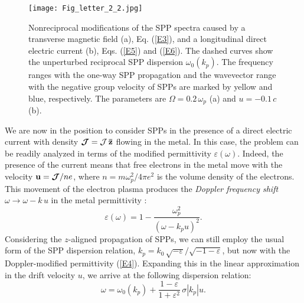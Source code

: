 \documentclass[9pt,twocolumn,twoside]{osajnl}
\begin{document}
\begin{figure}[t]
\centering
\texttt{[image: Fig\_letter\_2\_2.jpg]}
\caption{Nonreciprocal modifications of the SPP spectra caused by a transverse magnetic field (a), Eq. (\ref{E3}), and a longitudinal direct electric current (b), Eqs. (\ref{E5}) and (\ref{E6}). The dashed curves show the unperturbed reciprocal SPP dispersion ${\omega _0}\left( {{k_p}} \right)$. The frequency ranges with the one-way SPP propagation and the wavevector range with the negative group velocity of SPPs are marked by yellow and blue, respectively. The parameters are $\Omega = 0.2\, \omega_p$ (a) and $u=-0.1\,c$ (b).}
\label{F2}
\end{figure}

We are now in the position to consider SPPs in the presence of a direct electric current with density ${{\bm{\mathcal J}}} = {\mathcal J}\,{\bf{\bar z}}$ flowing in the metal. In this case, the problem can be readily analyzed in terms of the modified permittivity $\varepsilon \left( \omega  \right)$. Indeed, the presence of the current means that free electrons in the metal move with the velocity ${\bf{u}} = {{\bm{\mathcal J}}}/n e$, where $n=m\omega_p^2 / 4\pi e^2$ is the volume density of the electrons. This movement of the electron plasma produces the {\it Doppler frequency shift} $\omega  \to \omega  - k\, u$ in the metal permittivity \cite{PK}:
%
\begin{equation}
\varepsilon \left( \omega  \right) = 1 - \frac{{\omega _p^2}}{{{{\left( {\omega  - {k_p}u} \right)}^2}}} .
\label{E4}
\end{equation}
%
Considering the $z$-aligned propagation of SPPs, we can still employ the usual form of the SPP dispersion relation, ${k_p} = {k_0}\,\sqrt { - \varepsilon } /\sqrt { - 1 - \varepsilon }$, but now with the Doppler-modified permittivity (\ref{E4}). Expanding this in the linear approximation in the drift velocity $u$, we arrive at the following dispersion relation:
%
\begin{equation}
\omega  = {\omega _0}\!\left( {{k_p}} \right) + \frac{{1 - \varepsilon }}{{1 + {\varepsilon ^2}}}\,\sigma \left| {{k_p}} \right| u .
\label{E5}
\end{equation}
%
\end{document}
